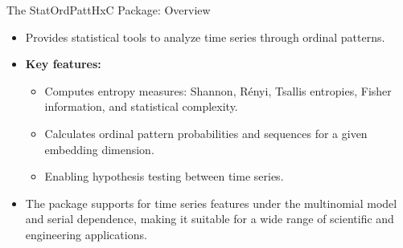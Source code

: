 \documentclass{beamer}
\begin{document}




\begin{frame}{The StatOrdPattHxC Package: Overview}
	\begin{itemize}
		\item Provides statistical tools to analyze time series through ordinal patterns.
		\item \textbf{Key features:}
		\begin{itemize}
			\item Computes entropy measures: Shannon, Rényi, Tsallis entropies, Fisher information, and statistical complexity.
			\item Calculates ordinal pattern probabilities and sequences for a given embedding dimension.
			\item Enabling hypothesis testing between time series.
		\end{itemize}
		\item The package supports for time series features under the multinomial model and serial dependence, making it suitable for a wide range of scientific and engineering applications.
	\end{itemize}
\end{frame}
\end{document}
